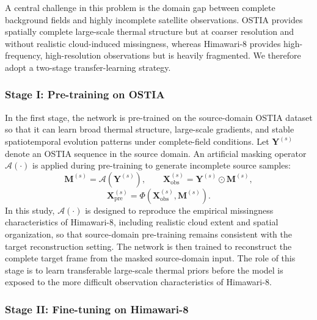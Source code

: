 \documentclass[12pt,reqno]{amsart}
\begin{document}
A central challenge in this problem is the domain gap between complete background fields and highly incomplete satellite observations. OSTIA provides spatially complete large-scale thermal structure but at coarser resolution and without realistic cloud-induced missingness, whereas Himawari-8 provides high-frequency, high-resolution observations but is heavily fragmented. We therefore adopt a two-stage transfer-learning strategy.

\subsubsection*{Stage I: Pre-training on OSTIA}

In the first stage, the network is pre-trained on the source-domain OSTIA dataset so that it can learn broad thermal structure, large-scale gradients, and stable spatiotemporal evolution patterns under complete-field conditions. Let $\mathbf{Y}^{(s)}$ denote an OSTIA sequence in the source domain. An artificial masking operator $\mathcal{A}(\cdot)$ is applied during pre-training to generate incomplete source samples:
\begin{equation}
\mathbf{M}^{(s)} = \mathcal{A}\!\left(\mathbf{Y}^{(s)}\right), \qquad
\mathbf{X}^{(s)}_{\mathrm{obs}} = \mathbf{Y}^{(s)}\odot \mathbf{M}^{(s)},
\end{equation}
\begin{equation}
\mathbf{X}^{(s)}_{\mathrm{pre}} = \Phi\left(\mathbf{X}^{(s)}_{\mathrm{obs}},\mathbf{M}^{(s)}\right).
\end{equation}
In this study, $\mathcal{A}(\cdot)$ is designed to reproduce the empirical missingness characteristics of Himawari-8, including realistic cloud extent and spatial organization, so that source-domain pre-training remains consistent with the target reconstruction setting. The network is then trained to reconstruct the complete target frame from the masked source-domain input. The role of this stage is to learn transferable large-scale thermal priors before the model is exposed to the more difficult observation characteristics of Himawari-8.

\subsubsection*{Stage II: Fine-tuning on Himawari-8}
\end{document}
